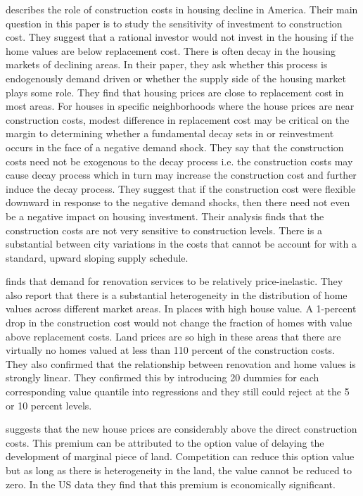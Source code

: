 \citet{gyourko2003urban} describes the role of construction costs in housing decline in America. Their main question in this paper is to study the sensitivity of investment to construction cost. They suggest that a rational investor would not invest in the housing if the home values are below replacement cost. There is often decay in the housing markets of declining areas. In their paper, they ask whether this process is endogenously demand driven or whether the supply side of the housing market plays some role. They find that housing prices are close to replacement cost in most areas. For houses in specific neighborhoods where the house prices are near construction costs, modest difference in replacement cost may be critical on the margin to determining whether a fundamental decay sets in or reinvestment occurs in the face of a negative demand shock. They say that the construction costs need not be exogenous to the decay process i.e. the construction costs may cause decay process which in turn may increase the construction cost and further induce the decay process. They suggest that if the construction cost were flexible downward in response to the negative demand shocks, then there need not even be a negative impact on housing investment. Their analysis finds that the construction costs are not very sensitive to construction levels. There is a substantial between city variations in the costs that cannot be account for with a standard, upward sloping supply schedule.



\citet{gyourko2004reinvestment} finds that demand for renovation services to be relatively price-inelastic. They also report that there is a substantial heterogeneity in the distribution of home values across different market areas. In places with high house value. A 1-percent drop in the construction cost would not change the fraction of homes with value above replacement costs. Land prices are so high in these areas that there are virtually no homes valued at less than 110 percent of the construction costs. They also confirmed that the relationship between renovation and home values is strongly linear. They confirmed this by introducing 20 dummies for each corresponding value quantile into regressions and they still could reject at the 5 or 10 percent levels. 



\citet{guthrie2010house} suggests that the new house prices are considerably above the direct construction costs. This premium can be attributed to the option value of delaying the development of marginal piece of land. Competition can reduce this option value but as long as there is heterogeneity in the land, the value cannot be reduced to zero. In the US data they find that this premium is economically significant.



